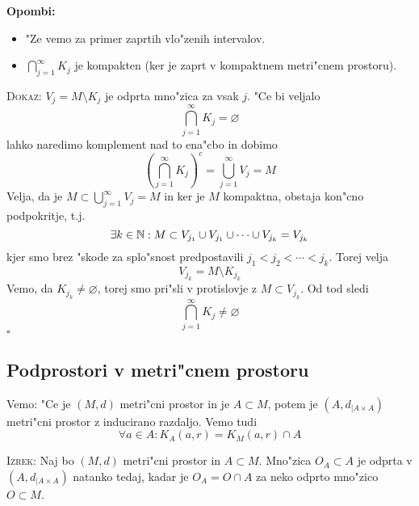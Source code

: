 \textbf{Opombi:}
\begin{itemize}
    \item "Ze vemo za primer zaprtih vlo"zenih intervalov.
    \item $\bigcap_{j=1}^\infty K_j$ je kompakten (ker je zaprt v kompaktnem metri"cnem prostoru).
\end{itemize}
\textsc{Dokaz:} $V_j = M \setminus K_j$ je odprta mno"zica za vsak $j$. "Ce bi veljalo
\begin{equation*}
\bigcap_{j=1}^\infty K_j  = \varnothing
\end{equation*}
lahko naredimo komplement nad to ena"cbo in dobimo
\begin{equation*}
\left( \bigcap_{j=1}^\infty K_j \right)^c = \bigcup_{j=1}^\infty V_j = M
\end{equation*}
Velja, da je $M \subset \bigcup_{j=1}^\infty V_j = M$ in ker je $M$ kompaktna, obstaja kon"cno podpokritje, t.j.
\begin{equation*}
\exists k \in \mathbb{N}: M \subset V_{j_1} \cup V_{j_1} \cup \cdots \cup V_{j_k} = V_{j_k}
\end{equation*}
kjer smo brez "skode za splo"snost predpostavili $j_1 < j_2 < \cdots < j_k$. Torej velja
\begin{equation*}
V_{j_k} = M \setminus K_{j_k}
\end{equation*}
Vemo, da $K_{j_k} \neq \varnothing$, torej smo pri"sli v protislovje z $M \subset V_{j_k}$. Od tod sledi 
\begin{equation*}
\bigcap_{j=1}^\infty K_j \neq \varnothing
\end{equation*}
\hfill $\square$

\subsection{Podprostori v metri"cnem prostoru}
Vemo: "Ce je $(M, d)$ metri"cni prostor in je $A \subset M$, potem je $(A, d_{|A \times A})$ metri"cni prostor z inducirano razdaljo. Vemo tudi
\begin{equation*}
\forall a \in A: K_A(a, r) = K_M(a, r) \cap A
\end{equation*}

\textsc{Izrek:} Naj bo $(M, d)$ metri"cni prostor in $A \subset M$. Mno"zica $O_A \subset A$ je odprta v $(A, d_{|A \times A})$ natanko tedaj, kadar je $O_A = O \cap A$ za neko odprto mno"zico $O \subset M$.

